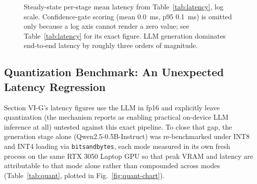 \documentclass[conference]{IEEEtran}
\begin{document}
\begin{figure}[t]
\centering
{}
\caption{Steady-state per-stage mean latency from Table~\ref{tab:latency}, log scale. Confidence-gate scoring (mean 0.0~ms, p95 0.1~ms) is omitted only because a log axis cannot render a zero value; see Table~\ref{tab:latency} for its exact figure. LLM generation dominates end-to-end latency by roughly three orders of magnitude.}
\label{fig:latency-chart}
\end{figure}

\subsection{Quantization Benchmark: An Unexpected Latency Regression}
Section VI-G's latency figures use the LLM in fp16 and explicitly leave quantization (the mechanism \cite{compactllm2026} reports as enabling practical on-device LLM inference at all) untested against this exact pipeline. To close that gap, the generation stage alone (Qwen2.5-0.5B-Instruct) was re-benchmarked under INT8 and INT4 loading via \texttt{bitsandbytes}, each mode measured in its own fresh process on the same RTX 3050 Laptop GPU so that peak VRAM and latency are attributable to that mode alone rather than compounded across modes (Table~\ref{tab:quant}, plotted in Fig.~\ref{fig:quant-chart}).
\end{document}
